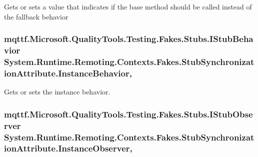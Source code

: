 Gets or sets a value that indicates if the base method should be called instead of the fallback behavior

\hypertarget{class_system_1_1_runtime_1_1_remoting_1_1_contexts_1_1_fakes_1_1_stub_synchronization_attribute_aa801aa85b1345b112466b3f06c4f1219}{
\subsubsection[{Instance\-Behavior}]{\setlength{\rightskip}{0pt plus 5cm}mqttf.\-Microsoft.\-Quality\-Tools.\-Testing.\-Fakes.\-Stubs.\-I\-Stub\-Behavior System.\-Runtime.\-Remoting.\-Contexts.\-Fakes.\-Stub\-Synchronization\-Attribute.\-Instance\-Behavior\hspace{0.3cm}{\ttfamily [get]}, {\ttfamily [set]}}}\label{class_system_1_1_runtime_1_1_remoting_1_1_contexts_1_1_fakes_1_1_stub_synchronization_attribute_aa801aa85b1345b112466b3f06c4f1219}


Gets or sets the instance behavior.

\hypertarget{class_system_1_1_runtime_1_1_remoting_1_1_contexts_1_1_fakes_1_1_stub_synchronization_attribute_adcaed458a8b11a24db40178877515045}{
\subsubsection[{Instance\-Observer}]{\setlength{\rightskip}{0pt plus 5cm}mqttf.\-Microsoft.\-Quality\-Tools.\-Testing.\-Fakes.\-Stubs.\-I\-Stub\-Observer System.\-Runtime.\-Remoting.\-Contexts.\-Fakes.\-Stub\-Synchronization\-Attribute.\-Instance\-Observer\hspace{0.3cm}{\ttfamily [get]}, {\ttfamily [set]}}}\label{class_system_1_1_runtime_1_1_remoting_1_1_contexts_1_1_fakes_1_1_stub_synchronization_attribute_adcaed458a8b11a24db40178877515045}


